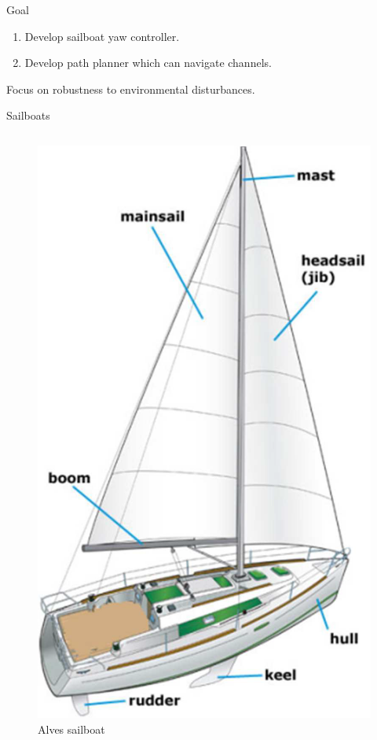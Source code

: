 \documentclass[10pt,xcolor={table,dvipsnames},t]{beamer}
\begin{document}
\begin{frame}{Goal}

\begin{enumerate}
    \item Develop sailboat yaw controller.
    \item Develop path planner which can navigate channels.
\end{enumerate}
Focus on robustness to environmental disturbances.

\end{frame}
  

\begin{frame}{Sailboats}
\begin{columns}
\begin{figure}
    \centering
    \includegraphics[width=0.3\linewidth]{documents/figures/alves_sailboat.png}
    \caption{Alves sailboat \cite{Alves2010}}
    \label{fig:alves_sailboat}
\end{figure}


\end{columns}
\end{frame}
\end{document}
